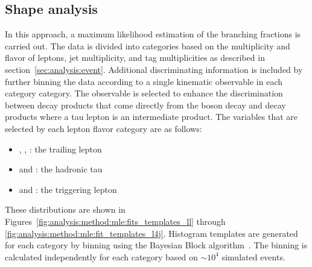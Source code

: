
\subsection{Shape analysis}
\label{sec:analysis:method:mle}

In this approach, a maximum likelihood estimation of the branching fractions is carried out.  The data is divided into categories based on the multiplicity and flavor of leptons, jet multiplicity, and \PQb tag multiplicities as described in section~\ref{sec:analysis:event}.  Additional discriminating information is included by further binning the data according to a single kinematic observable in each category category. The observable is selected to enhance the discrimination between decay products that come directly from the \PW boson decay and decay products where a tau lepton is an intermediate product.  The variables that are selected by each lepton flavor category are as follows:
\begin{itemize}
    \item \cee, \cmm, \cem: the trailing lepton \pt
    \item \cet and \cmt: the hadronic tau \pt
    \item \ceh and \cmh: the triggering lepton \pt
\end{itemize}
\noindent These distributions are shown in Figures~\ref{fig:analysis:method:mle:fits_templates_ll} through \ref{fig:analysis:method:mle:fit_templates_l4j}. Histogram templates are generated for each category by binning using the Bayesian Block algorithm~\cite{Pollack:2017srh}.  The binning is calculated independently for each category based on $\sim 10^{4}$ simulated events.
